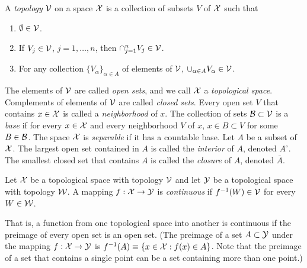 \begin{Definition}
    A {\em topology\/} ${\cal V}$ on a space ${\cal X}$ is a collection of subsets $V$ of ${\cal X}$ such
    that
    \begin{enumerate}
        \item $\emptyset \in {\cal V}$.
        \item If $V_j \in {\cal V}$, $j = 1, \ldots, n$, then $\cap_{j=1}^n V_j \in {\cal V}$.
        \item For any collection $\{V_\alpha\}_{\alpha \in A}$ of elements of ${\cal V}$,
            $\cup_{\alpha \in A} V_\alpha \in {\cal V}$.
    \end{enumerate}
    The elements of ${\cal V}$ are called {\em open sets\/}, and we call ${\cal X}$ a
    {\em topological space\/}.
    Complements of elements of ${\cal V}$ are called {\em closed sets\/}.
    Every open set $V$ that contains $x \in {\cal X}$ is called a {\em neighborhood\/} of
    $x$.
    The collection of sets ${\cal B} \subset {\cal V}$ is a {\em base\/}
    if for every $x \in {\cal X}$ and every neighborhood
    $V$ of $x$, $x \in B \subset V$ for some $B \in {\cal B}$.
    The space ${\cal X}$ is {\em separable\/} if it has a countable base.
    Let $A$ be a subset of ${\cal X}$.
    The largest open set contained in $A$ is called the
    {\em interior\/} of $A$, denoted $A^\circ$.
    The smallest closed set that contains $A$ is called the {\em closure\/} of
    $A$, denoted $\bar{A}$.
\end{Definition}

\begin{Definition}
    Let ${\cal X}$ be a topological space with topology ${\cal V}$ and let ${\cal Y}$ be
    a topological space with topology ${\cal W}$. A mapping $f: {\cal X} \rightarrow {\cal Y}$
    is {\em continuous\/} if $f^{-1}(W) \in {\cal V}$ for every $W \in {\cal W}$.
\end{Definition}

That is, a function from one topological space into another is continuous if the
preimage of every open set is an open set.
(The preimage of a set $A \subset {\cal Y}$ under the mapping $f: {\cal X} \rightarrow {\cal Y}$
is $f^{-1}(A) \equiv \{ x \in {\cal X} : f(x) \in A \}$.
Note that the preimage of a set that contains a single point can be a set
containing more than one point.)

